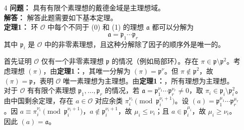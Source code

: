 \documentclass[UTF8]{ctexart}
\begin{document}
\begin{enumerate}
\begin{enumerate}
\item[4]
\textbf{问题：} 具有有限个素理想的戴德金域是主理想域。\\
\textbf{解答：} 解答此题需要如下基本定理。\\
\textbf{定理1：} 环 \(\mathcal{O}\) 中每个不同于 (0) 和 (1) 的理想  $\mathfrak{a}$ 都可以分解为
$$
\mathfrak{a}=\mathfrak{p}_1 \cdots \mathfrak{p}_r
$$
其中 $\mathfrak{p}_i$ 是 $\mathcal{O}$ 中的非零素理想，且这种分解除了因子的顺序外是唯一的。

首先证明 \(\mathcal{O}\) 仅有一个非零素理想 \(\mathfrak{p}\) 的情况（例如局部环）。存在 \(\pi \in \mathfrak{p} \setminus \mathfrak{p}^2\)。考虑理想 \((\pi)\)，由\textbf{定理1：}，其唯一分解为 \((\pi) = \mathfrak{p}^\nu\)。但 \(\pi \notin \mathfrak{p}^2\)，故 \((\pi) = \mathfrak{p}\)，表明 \(\mathcal{O}\) 唯一素理想为主理想。由\textbf{定理1：}，所有理想为主理想。  
对于 \(\mathcal{O}\) 有有限个素理想 \(\mathfrak{p}_1, \dots, \mathfrak{p}_r\) 的情况，若 \(\mathfrak{a} = \mathfrak{p}_1^{\nu_1} \cdots \mathfrak{p}_r^{\nu_r} \neq 0\)，取 \(\pi_i \in \mathfrak{p}_i \setminus \mathfrak{p}_i^2\)。由中国剩余定理，存在 \(a \in \mathcal{O}\) 对应余类 \(\pi_i^{\nu_i} \pmod{\mathfrak{p}_i^{\nu_i + 1}}\)。设 \((a) = \mathfrak{p}_1^{\mu_1} \cdots \mathfrak{p}_r^{\mu_r}\)。因 \(a \equiv \pi_i^{\nu_i} \pmod{\mathfrak{p}_i^{\nu_i + 1}}\)，\(a \notin \mathfrak{p}_i^{\nu_i + 1}\)，故 \(\mu_i \leq \nu_i\)；且 \(a \in \mathfrak{p}_i^{\mu_i}\)，故 \(\mu_i \geq \nu_i\)。因此 \((a) = \mathfrak{a}\)。


\end{enumerate}
\end{enumerate}
\end{document}
